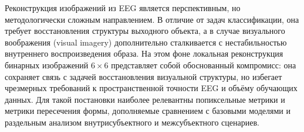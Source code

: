 Реконструкция изображений из EEG является перспективным, но методологически сложным направлением. В отличие от задач классификации, она требует восстановления структуры выходного объекта, а в случае визуального воображения (visual imagery) дополнительно сталкивается с нестабильностью внутреннего воспроизведения образа. На этом фоне локальная реконструкция бинарных изображений $6 \times 6$ представляет собой обоснованный компромисс: она сохраняет связь с задачей восстановления визуальной структуры, но избегает чрезмерных требований к пространственной точности EEG и объёму обучающих данных. Для такой постановки наиболее релевантны попиксельные метрики и метрики пересечения формы, дополняемые сравнением с базовыми моделями и раздельным анализом внутрисубъектного и межсубъектного сценариев.
